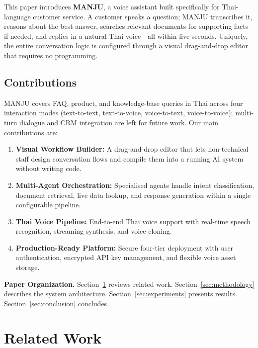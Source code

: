 \documentclass[10pt, a4paper, twocolumn]{article}
\begin{document}
This paper introduces \textbf{MANJU}, a voice assistant built specifically
for Thai-language customer service.
A customer speaks a question; MANJU transcribes it, reasons about the
best answer, searches relevant documents for supporting facts if needed,
and replies in a natural Thai voice---all within five seconds.
Uniquely, the entire conversation logic is configured through a visual
drag-and-drop editor that requires no programming.

\subsection{Contributions}
MANJU covers FAQ, product, and knowledge-base queries in Thai across four interaction modes (text-to-text, text-to-voice, voice-to-text, voice-to-voice); multi-turn dialogue and CRM integration are left for future work.
Our main contributions are:
\begin{enumerate}[label=(\roman*)]
    \item \textbf{Visual Workflow Builder:} A drag-and-drop editor that lets non-technical staff design conversation flows and compile them into a running AI system without writing code.
    \item \textbf{Multi-Agent Orchestration:} Specialised agents handle intent classification, document retrieval, live data lookup, and response generation within a single configurable pipeline.
    \item \textbf{Thai Voice Pipeline:} End-to-end Thai voice support with real-time speech recognition, streaming synthesis, and voice cloning.
    \item \textbf{Production-Ready Platform:} Secure four-tier deployment with user authentication, encrypted API key management, and flexible voice asset storage.
\end{enumerate}

\noindent\textbf{Paper Organization.}
Section~\ref{sec:related} reviews related work.
Section~\ref{sec:methodology} describes the system architecture.
Section~\ref{sec:experiments} presents results.
Section~\ref{sec:conclusion} concludes.

\section{Related Work}
\label{sec:related}
\end{document}
